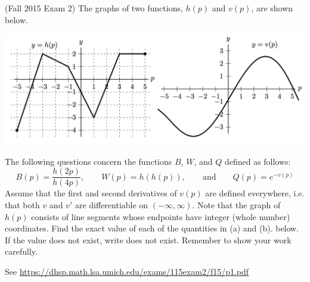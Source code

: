 \documentclass[11pt]{exam}
\begin{document}
\begin{questions}
\begin{solution}
        \end{solution}
\question (Fall 2015 Exam 2) The graphs of two functions, \(h(p)\) and \(v(p)\), are shown below.
  \begin{center}
    \includegraphics[scale=0.5]{Fall15Exam2p1}
  \end{center}
The following questions concern the functions \(B\), \(W\), and \(Q\) defined as
follows: \[
  B(p) = \frac{h(2p)}{h(4p)}, \qquad W(p) = h(h(p)), \qquad \text{and}\qquad Q(p) = e^{-v(p)}
\]
Assume that the first and second derivatives of \(v(p)\) are defined everywhere, i.e. that both \(v\)
and \(v'\) are differentiable on \((-\infty, \infty)\). Note that the graph of \(h(p)\) consists of line segments
whose endpoints have integer (whole number) coordinates. Find the exact value of each of
the quantities in (a) and (b). below. If the value does not exist, write does not exist.
Remember to show your work carefully.
\begin{solution}
  See \href{https://dhsp.math.lsa.umich.edu/exams/115exam2/f15/p1.pdf}{https://dhsp.math.lsa.umich.edu/exams/115exam2/f15/p1.pdf}
\end{solution}
\end{questions}
\end{document}
